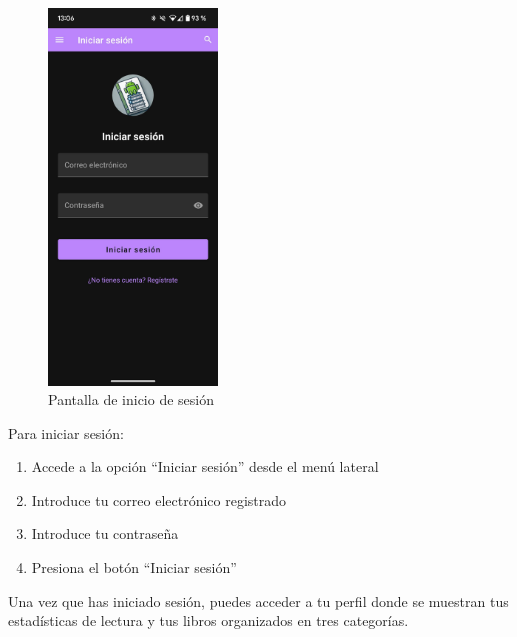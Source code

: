 \documentclass[a4paper,12pt]{report}
\begin{document}
    \begin{figure}[H]
      \centering
      \includegraphics[width=0.4\textwidth]{.img/login.png}
      \caption{Pantalla de inicio de sesión}
      \label{fig:login}
    \end{figure}
    
    Para iniciar sesión:
    \begin{enumerate}
      \item Accede a la opción ``Iniciar sesión'' desde el menú lateral
      \item Introduce tu correo electrónico registrado
      \item Introduce tu contraseña
      \item Presiona el botón ``Iniciar sesión''
    \end{enumerate}
    
    
    Una vez que has iniciado sesión, puedes acceder a tu perfil donde se muestran tus estadísticas de lectura y tus libros organizados en tres categorías.
    
\end{document}
